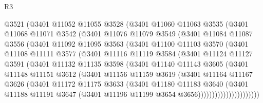 \begin{lexlean}{R3}
\begin{coremodule}
          @3521
          (@3401
            @11052
            @11055
            @3528
            (@3401
              @11060
              @11063
              @3535
              (@3401
                @11068
                @11071
                @3542
                (@3401
                  @11076
                  @11079
                  @3549
                  (@3401
                    @11084
                    @11087
                    @3556
                    (@3401
                      @11092
                      @11095
                      @3563
                      (@3401
                        @11100
                        @11103
                        @3570
                        (@3401
                          @11108
                          @11111
                          @3577
                          (@3401
                            @11116
                            @11119
                            @3584
                            (@3401
                              @11124
                              @11127
                              @3591
                              (@3401
                                @11132
                                @11135
                                @3598
                                (@3401
                                  @11140
                                  @11143
                                  @3605
                                  (@3401
                                    @11148
                                    @11151
                                    @3612
                                    (@3401
                                      @11156
                                      @11159
                                      @3619
                                      (@3401
                                        @11164
                                        @11167
                                        @3626
                                        (@3401
                                          @11172
                                          @11175
                                          @3633
                                          (@3401
                                            @11180
                                            @11183
                                            @3640
                                            (@3401
                                              @11188
                                              @11191
                                              @3647
                                              (@3401 @11196 @11199 @3654 @3656))))))))))))))))))))))

\end{coremodule}
\end{lexlean}
